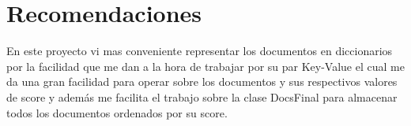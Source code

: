 \documentclass[a4paper,12pt]{article}
\begin{document}
        \newpage
        \section{Recomendaciones}
            En este proyecto vi mas conveniente representar los documentos en diccionarios por la facilidad
            que me dan a la hora de trabajar por su par Key-Value el cual me da una gran facilidad para operar sobre
            los documentos y sus respectivos valores de score y además me facilita el trabajo sobre la clase DocsFinal
            para almacenar todos los documentos ordenados por su score.
        
        \newpage
        \tableofcontents
        
    
\end{document}
